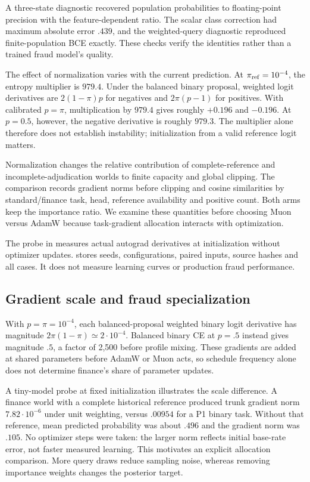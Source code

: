 \documentclass[11pt]{article}
\begin{document}
A three-state diagnostic recovered population probabilities to floating-point precision with the feature-dependent ratio. The scalar class correction had maximum absolute error $.439$, and the weighted-query diagnostic reproduced finite-population BCE exactly. These checks verify the identities rather than a trained fraud model's quality.

The effect of normalization varies with the current prediction. At $\pi_{\rm ref}=10^{-4}$, the entropy multiplier is $979.4$. Under the balanced binary proposal, weighted logit derivatives are $2(1-\pi)p$ for negatives and $2\pi(p-1)$ for positives. With calibrated $p=\pi$, multiplication by $979.4$ gives roughly $+0.196$ and $-0.196$. At $p=0.5$, however, the negative derivative is roughly $979.3$. The multiplier alone therefore does not establish instability; initialization from a valid reference logit matters.

Normalization changes the relative contribution of complete-reference and incomplete-adjudication worlds to finite capacity and global clipping. The comparison records gradient norms before clipping and cosine similarities by standard/finance task, head, reference availability and positive count. Both arms keep the importance ratio. We examine these quantities before choosing Muon versus AdamW because task-gradient allocation interacts with optimization.

The probe in  measures actual autograd derivatives at initialization without optimizer updates.  stores seeds, configurations, paired inputs, source hashes and all cases. It does not measure learning curves or production fraud performance.

\subsection{Gradient scale and fraud specialization}
\label{sec:specialist}

With $p=\pi=10^{-4}$, each balanced-proposal weighted binary logit derivative has magnitude $2\pi(1-\pi)\simeq2\cdot10^{-4}$. Balanced binary CE at $p=.5$ instead gives magnitude $.5$, a factor of 2,500 before profile mixing. These gradients are added at shared parameters before AdamW or Muon acts, so schedule frequency alone does not determine finance's share of parameter updates.

A tiny-model probe at fixed initialization illustrates the scale difference. A finance world with a complete historical reference produced trunk gradient norm $7.82\cdot10^{-6}$ under unit weighting, versus $.00954$ for a P1 binary task. Without that reference, mean predicted probability was about $.496$ and the gradient norm was $.105$. No optimizer steps were taken: the larger norm reflects initial base-rate error, not faster measured learning. This motivates an explicit allocation comparison. More query draws reduce sampling noise, whereas removing importance weights changes the posterior target.
\end{document}
